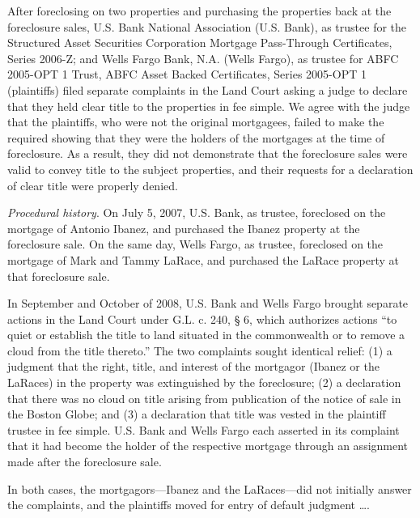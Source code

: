 

After foreclosing on two properties and purchasing the properties back at the
foreclosure sales, U.S. Bank National Association (U.S. Bank), as trustee for
the Structured Asset Securities Corporation Mortgage Pass-Through Certificates,
Series 2006-Z; and Wells Fargo Bank, N.A. (Wells Fargo), as trustee for ABFC
2005-OPT 1 Trust, ABFC Asset Backed Certificates, Series 2005-OPT 1
(plaintiffs) filed separate complaints in the Land Court asking a judge to
declare that they held clear title to the properties in fee simple. We agree
with the judge that the plaintiffs, who were not the original mortgagees,
failed to make the required showing that they were the holders of the mortgages
at the time of foreclosure. As a result, they did not demonstrate that the
foreclosure sales were valid to convey title to the subject properties, and
their requests for a declaration of clear title were properly denied.

\textit{Procedural history}. On July 5, 2007, U.S. Bank, as trustee, foreclosed
on the mortgage of Antonio Ibanez, and purchased the Ibanez property at the
foreclosure sale. On the same day, Wells Fargo, as trustee, foreclosed on the
mortgage of Mark and Tammy LaRace, and purchased the LaRace property at that
foreclosure sale.

In September and October of 2008, U.S. Bank and Wells Fargo brought separate
actions in the Land Court under G.L. c. 240, {\S} 6, which authorizes actions
``to quiet or establish the title to land situated in the commonwealth or to
remove a cloud from the title thereto.'' The two complaints sought identical
relief: (1) a judgment that the right, title, and interest of the mortgagor
(Ibanez or the LaRaces) in the property was extinguished by the foreclosure;
(2) a declaration that there was no cloud on title arising from publication of
the notice of sale in the Boston Globe; and (3) a declaration that title was
vested in the plaintiff trustee in fee simple. U.S. Bank and Wells Fargo each
asserted in its complaint that it had become the holder of the respective
mortgage through an assignment made after the foreclosure sale.

In both cases, the mortgagors---Ibanez and the LaRaces---did not initially
answer the complaints, and the plaintiffs moved for entry of default
judgment \dots .

